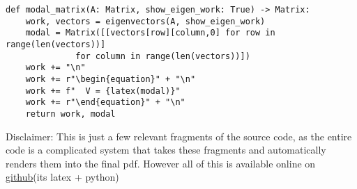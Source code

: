 \begin{verbatim}
def modal_matrix(A: Matrix, show_eigen_work: True) -> Matrix:
    work, vectors = eigenvectors(A, show_eigen_work)
    modal = Matrix([[vectors[row][column,0] for row in range(len(vectors))]
              for column in range(len(vectors))])
    work += "\n"
    work += r"\begin{equation}" + "\n"
    work += f"  V = {latex(modal)}"
    work += r"\end{equation}" + "\n"
    return work, modal
\end{verbatim}



Disclaimer: This is just a few relevant fragments of the source code, as the entire code is a complicated system
that takes these fragments and automatically renders them into the final pdf. However all of this is available
online on \href{https://github.com/NathanRoseCE/ControlsClass}{github}(its latex + python)